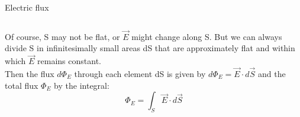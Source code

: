 \begin{frame}{Electric flux}
\begin{columns}
\begin{column}{0.67\textwidth}
{    Of course, S may not be flat, or $\vec{E}$ might change along S.
    But we can always divide S in infinitesimally small areas dS that are approximately
    flat and within which $\vec{E}$ remains constant.\\
    Then the flux $d\Phi_{E}$ through each element dS is given by $d\Phi_{E} = \vec{E} \cdot d\vec{S}$
    and the total flux $\Phi_E$ by the integral:
    \begin{equation*}
       \Phi_{E} = \int_{S} \vec{E} \cdot d\vec{S}
    \end{equation*}
  }
  \end{column}
\end{columns}

\end{frame}




%
%

